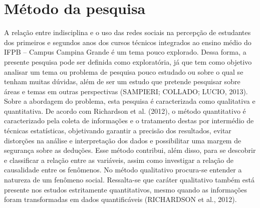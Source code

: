 \section{Método da pesquisa}

A relação entre indisciplina e o uso das redes
sociais na percepção de estudantes dos primeiros
e segundos anos dos cursos técnicos integrados ao
ensino médio do IFPB – Campus Campina Grande é
um tema pouco explorado. Dessa forma, a presente
pesquisa pode ser definida como exploratória, já que
tem como objetivo analisar um tema ou problema de
pesquisa pouco estudado ou sobre o qual se tenham
muitas dúvidas, além de ser um estudo que pretende
pesquisar sobre áreas e temas em outras perspectivas
(SAMPIERI; COLLADO; LUCIO, 2013).
Sobre a abordagem do problema, esta pesquisa
é caracterizada como qualitativa e quantitativa.
De acordo com Richardson et al. (2012), o método
quantitativo é caracterizado pela coleta de informações
e o tratamento destas por intermédio de técnicas
estatísticas, objetivando garantir a precisão dos
resultados, evitar distorções na análise e interpretação
dos dados e possibilitar uma margem de segurança
sobre as deduções. Esse método contribui, além
disso, para se descobrir e classificar a relação entre
as variáveis, assim como investigar a relação de
causalidade entre os fenômenos. No método qualitativo
procura-se entender a natureza de um fenômeno
social. Ressalta-se que caráter qualitativo também
está presente nos estudos estritamente quantitativos,
mesmo quando as informações foram transformadas
em dados quantificáveis (RICHARDSON et al., 2012).